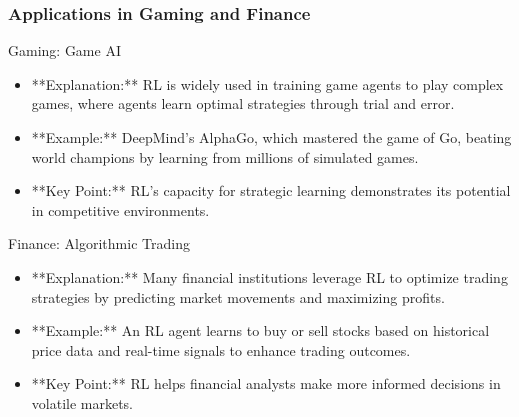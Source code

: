 \documentclass[aspectratio=169]{beamer}
\begin{document}
\begin{frame}[fragile]
    \frametitle{Applications in Gaming and Finance}
    \begin{block}{Gaming: Game AI}
        \begin{itemize}
            \item **Explanation:** RL is widely used in training game agents to play complex games, where agents learn optimal strategies through trial and error.
            \item **Example:** DeepMind's AlphaGo, which mastered the game of Go, beating world champions by learning from millions of simulated games.
            \item **Key Point:** RL's capacity for strategic learning demonstrates its potential in competitive environments.
        \end{itemize}
    \end{block}
    
    \begin{block}{Finance: Algorithmic Trading}
        \begin{itemize}
            \item **Explanation:** Many financial institutions leverage RL to optimize trading strategies by predicting market movements and maximizing profits.
            \item **Example:** An RL agent learns to buy or sell stocks based on historical price data and real-time signals to enhance trading outcomes.
            \item **Key Point:** RL helps financial analysts make more informed decisions in volatile markets.
        \end{itemize}
    \end{block}
\end{frame}
\end{document}
